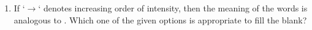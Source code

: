 \documentclass[journal,12pt,onecolumn]{IEEEtran}
\theoremstyle{remark}
\begin{document}
\begin{enumerate}[start=1, label=Q.\arabic*]

\item If `$\rightarrow$` denotes increasing order of intensity, then the meaning of the words  is analogous to .
    Which one of the given options is appropriate to fill the blank?
    \begin{enumerate}
    \end{enumerate}

    \hfill{}


\end{enumerate}
\end{document}
